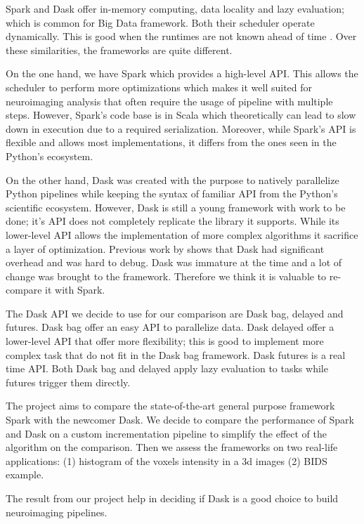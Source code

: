 \documentclass[11pt,a4paper]{article}
\begin{document}
Spark and Dask offer in-memory computing, data locality and lazy evaluation; which is
common for Big Data framework. Both their scheduler operate dynamically. This is good
when the runtimes are not known ahead of time \citep{Dask:15}. Over these
similarities, the frameworks are quite different.

On the one hand, we have Spark which provides a high-level API. This allows the
scheduler to perform more optimizations which makes it well suited for neuroimaging
analysis that often require the usage of pipeline with multiple steps. However,
Spark's code base is in Scala which theoretically can lead to slow down in execution
due to a required serialization. Moreover, while Spark's API is flexible and allows
most implementations, it differs from the ones seen in the Python's ecosystem.

On the other hand, Dask was created with the purpose to natively parallelize Python
pipelines while keeping the syntax of familiar API from the Python's scientific
ecosystem. However, Dask is still a young framework with work to be done; it's API
does not completely replicate the library it supports. While its lower-level API
allows the implementation of more complex algorithms it sacrifice a layer of
optimization.
Previous work by \citet{Mehta:17} shows that Dask had significant overhead and was
hard to debug.
Dask was immature at the time and a lot of change was brought to the framework.
Therefore we think it is valuable to re-compare it with Spark.

The Dask API we decide to use for our comparison are Dask bag, delayed and futures.
Dask bag offer an easy API to parallelize data. Dask delayed offer a lower-level API
that offer more flexibility; this is good to implement more complex task that do not
fit in the Dask bag framework. Dask futures is a real time API. Both Dask bag and
delayed apply lazy evaluation to tasks while futures trigger them directly.

The project aims to compare the state-of-the-art general purpose framework Spark with
the newcomer Dask. We decide to compare the performance of Spark and Dask on a custom
incrementation pipeline to simplify the effect of the algorithm on the comparison.
Then we assess the frameworks on two real-life applications: (1) histogram of the
voxels intensity in a 3d images (2) BIDS example.

The result from our project help in deciding if Dask is a good choice to build
neuroimaging pipelines.
\end{document}
